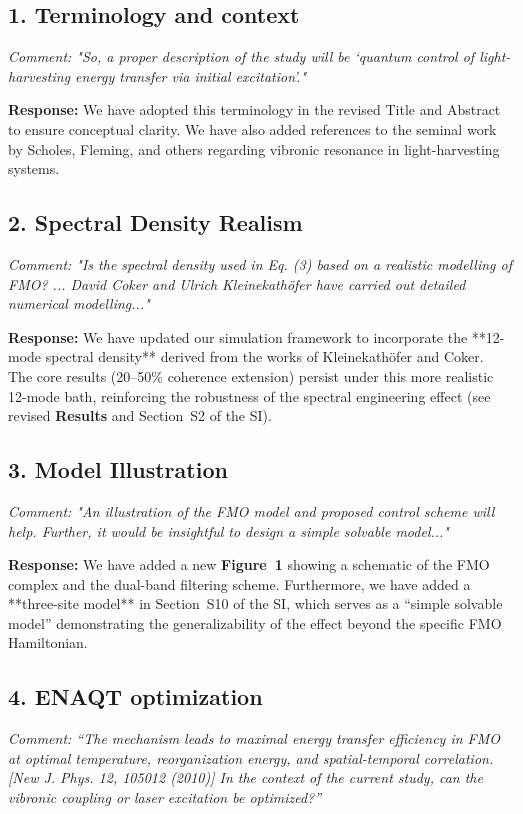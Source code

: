\documentclass[11pt]{article}
\begin{document}
\subsection*{1. Terminology and context}
\textit{Comment: "So, a proper description of the study will be ‘quantum control of light-harvesting energy transfer via initial excitation’."}

\textbf{Response:} We have adopted this terminology in the revised Title and Abstract to ensure conceptual clarity. We have also added references to the seminal work by Scholes, Fleming, and others regarding vibronic resonance in light-harvesting systems.

\subsection*{2. Spectral Density Realism}
\textit{Comment: "Is the spectral density used in Eq. (3) based on a realistic modelling of FMO? ... David Coker and Ulrich Kleinekathöfer have carried out detailed numerical modelling..."}

\textbf{Response:} We have updated our simulation framework to incorporate the **12-mode spectral density** derived from the works of Kleinekathöfer and Coker. The core results (20--50\% coherence extension) persist under this more realistic 12-mode bath, reinforcing the robustness of the spectral engineering effect (see revised \textbf{Results} and Section~S2 of the SI).

\subsection*{3. Model Illustration}
\textit{Comment: "An illustration of the FMO model and proposed control scheme will help. Further, it would be insightful to design a simple solvable model..."}

\textbf{Response:} We have added a new \textbf{Figure~1} showing a schematic of the FMO complex and the dual-band filtering scheme. Furthermore, we have added a **three-site model** in Section~S10 of the SI, which serves as a ``simple solvable model'' demonstrating the generalizability of the effect beyond the specific FMO Hamiltonian.

\subsection*{4. ENAQT optimization}
\textit{Comment: ``The mechanism leads to maximal energy transfer efficiency in FMO at optimal temperature, reorganization energy, and spatial-temporal correlation. [New J. Phys. 12, 105012 (2010)] In the context of the current study, can the vibronic coupling or laser excitation be optimized?''}
\end{document}
